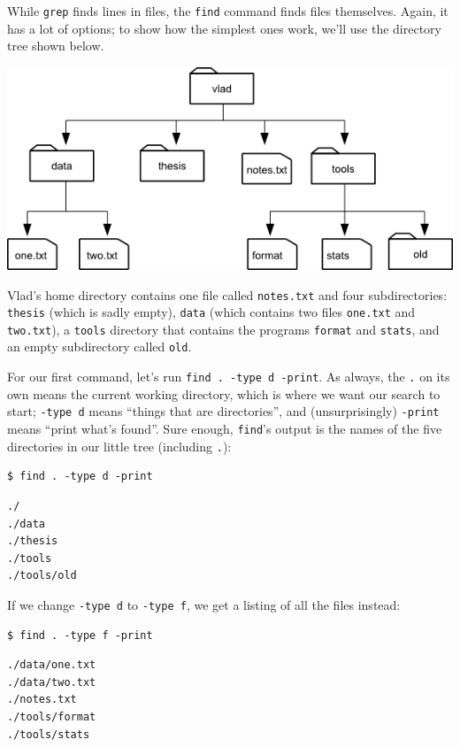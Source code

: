 \documentclass[]{book}
\begin{document}
While \texttt{grep} finds lines in files, the \texttt{find} command
finds files themselves. Again, it has a lot of options; to show how the
simplest ones work, we'll use the directory tree shown below.

\includegraphics{novice/shell/img/find-file-tree.png}

Vlad's home directory contains one file called \texttt{notes.txt} and
four subdirectories: \texttt{thesis} (which is sadly empty),
\texttt{data} (which contains two files \texttt{one.txt} and
\texttt{two.txt}), a \texttt{tools} directory that contains the programs
\texttt{format} and \texttt{stats}, and an empty subdirectory called
\texttt{old}.

For our first command, let's run \texttt{find . -type d -print}. As
always, the \texttt{.} on its own means the current working directory,
which is where we want our search to start; \texttt{-type d} means
``things that are directories'', and (unsurprisingly) \texttt{-print}
means ``print what's found''. Sure enough, \texttt{find}'s output is the
names of the five directories in our little tree (including \texttt{.}):

\begin{verbatim}
$ find . -type d -print
\end{verbatim}

\begin{verbatim}
./
./data
./thesis
./tools
./tools/old
\end{verbatim}

If we change \texttt{-type d} to \texttt{-type f}, we get a listing of
all the files instead:

\begin{verbatim}
$ find . -type f -print
\end{verbatim}

\begin{verbatim}
./data/one.txt
./data/two.txt
./notes.txt
./tools/format
./tools/stats
\end{verbatim}
\end{document}
